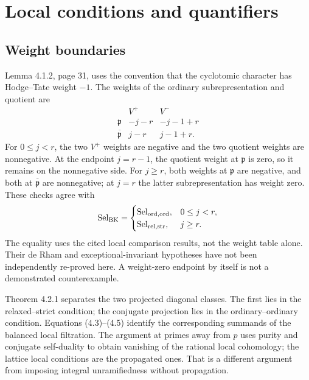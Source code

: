 \documentclass[10pt]{article}
\begin{document}
\section*{Local conditions and quantifiers}
\subsection*{Weight boundaries}
Lemma 4.1.2, page 31, uses the convention that the cyclotomic character has Hodge–Tate weight \(-1\). The weights of the ordinary subrepresentation and quotient are \[\begin{array}{c|cc}
 & V^+ & V^-\\ \hline
\mathfrak p & -j-r & -j-1+r\\
\overline{\mathfrak p} & j-r & j-1+r .
\end{array}\] For \(0\leq j<r\), the two \(V^+\) weights are negative and the two quotient weights are nonnegative. At the endpoint \(j=r-1\), the quotient weight at \(\mathfrak p\) is zero, so it remains on the nonnegative side. For \(j\geq r\), both weights at \(\mathfrak p\) are negative, and both at \(\overline{\mathfrak p}\) are nonnegative; at \(j=r\) the latter subrepresentation has weight zero. These checks agree with \[\operatorname{Sel}_{\rm BK}
=\begin{cases}
\operatorname{Sel}_{\rm ord,ord},&0\leq j<r,\\
\operatorname{Sel}_{\rm rel,str},&j\geq r.
\end{cases}\] The equality uses the cited local comparison results, not the weight table alone. Their de Rham and exceptional-invariant hypotheses have not been independently re-proved here. A weight-zero endpoint by itself is not a demonstrated counterexample.\par
Theorem 4.2.1 separates the two projected diagonal classes. The first lies in the relaxed–strict condition; the conjugate projection lies in the ordinary–ordinary condition. Equations (4.3)–(4.5) identify the corresponding summands of the balanced local filtration. The argument at primes away from \(p\) uses purity and conjugate self-duality to obtain vanishing of the rational local cohomology; the lattice local conditions are the propagated ones. That is a different argument from imposing integral unramifiedness without propagation.\par
\end{document}
